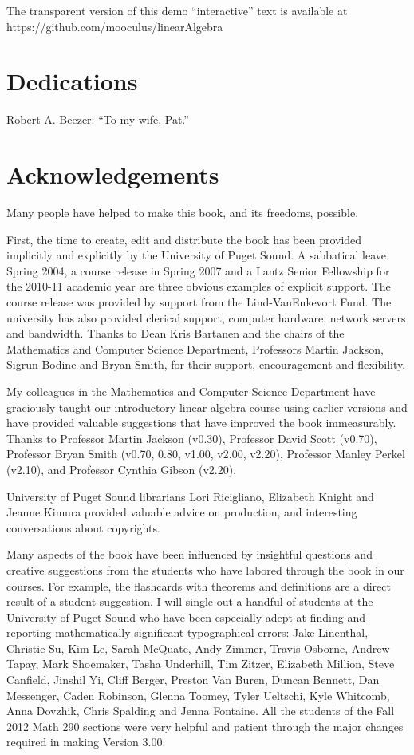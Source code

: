 \documentclass{ximera}
\begin{document}
The transparent version of this demo ``interactive'' text is available
at https://github.com/mooculus/linearAlgebra

\section{Dedications}

Robert A. Beezer: ``To my wife, Pat.''

\section{Acknowledgements}

Many people have helped to make this book, and its freedoms, possible.

First, the time to create, edit and distribute the book has been
provided implicitly and explicitly by the University of Puget Sound. A
sabbatical leave Spring 2004, a course release in Spring 2007 and a
Lantz Senior Fellowship for the 2010-11 academic year are three
obvious examples of explicit support. The course release was provided
by support from the Lind-VanEnkevort Fund. The university has also
provided clerical support, computer hardware, network servers and
bandwidth. Thanks to Dean Kris Bartanen and the chairs of the
Mathematics and Computer Science Department, Professors Martin
Jackson, Sigrun Bodine and Bryan Smith, for their support,
encouragement and flexibility.

My colleagues in the Mathematics and Computer Science Department have
graciously taught our introductory linear algebra course using earlier
versions and have provided valuable suggestions that have improved the
book immeasurably. Thanks to Professor Martin Jackson (v0.30),
Professor David Scott (v0.70), Professor Bryan Smith (v0.70, 0.80,
v1.00, v2.00, v2.20), Professor Manley Perkel (v2.10), and Professor
Cynthia Gibson (v2.20).

University of Puget Sound librarians Lori Ricigliano, Elizabeth Knight
and Jeanne Kimura provided valuable advice on production, and
interesting conversations about copyrights.

Many aspects of the book have been influenced by insightful questions
and creative suggestions from the students who have labored through
the book in our courses. For example, the flashcards with theorems and
definitions are a direct result of a student suggestion. I will single
out a handful of students at the University of Puget Sound who have
been especially adept at finding and reporting mathematically
significant typographical errors: Jake Linenthal, Christie Su, Kim Le,
Sarah McQuate, Andy Zimmer, Travis Osborne, Andrew Tapay, Mark
Shoemaker, Tasha Underhill, Tim Zitzer, Elizabeth Million, Steve
Canfield, Jinshil Yi, Cliff Berger, Preston Van Buren, Duncan Bennett,
Dan Messenger, Caden Robinson, Glenna Toomey, Tyler Ueltschi, Kyle
Whitcomb, Anna Dovzhik, Chris Spalding and Jenna Fontaine. All the
students of the Fall 2012 Math 290 sections were very helpful and
patient through the major changes required in making Version 3.00.
\end{document}
